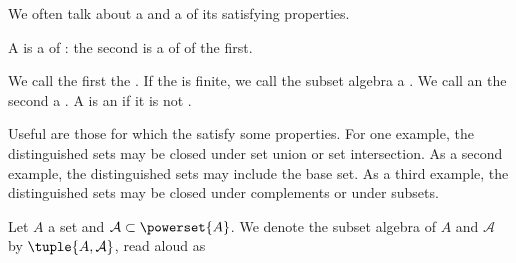 
\sbasic



\sstart



We often talk about a  and
a  of its 
satisfying properties.


A  is a
 of : the second
is a  of  of the first.

We call the first  the
.
If the  is finite,
we call the subset algebra a
.
We call an  the second
 a .
A  is an
if it is not .

Useful  are those for
which the 
satisfy some 
properties.
For one example, the distinguished sets may be closed under set union or
set intersection.
As a second example, the distinguished sets may include the base
set.
As a third example, the distinguished sets may be closed under
complements or under subsets.


Let $A$ a set and $\mathcal{A} \subset \powerset{A}$.
We denote the subset algebra of $A$ and $\mathcal{A}$
by $\tuple{A, \mathcal{A}}$, read aloud as 

\strats
